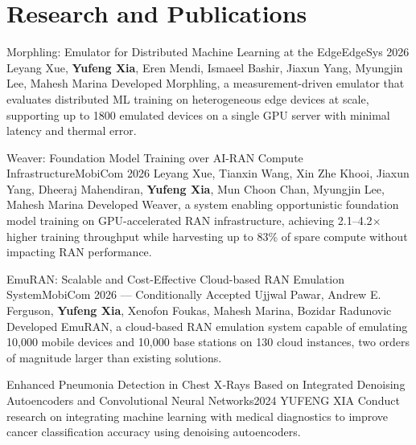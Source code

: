 \section{Research and Publications}
  \resumeSubHeadingListStart
    \resumeSubheading
      {Morphling: Emulator for Distributed Machine Learning at the Edge}{EdgeSys 2026}
      {Leyang Xue, \textbf{Yufeng Xia}, Eren Mendi, Ismaeel Bashir, Jiaxun Yang, Myungjin Lee, Mahesh Marina}{}
      \resumeItemListStart
          {Developed Morphling, a measurement-driven emulator that evaluates distributed ML training on heterogeneous edge devices at scale, supporting up to 1800 emulated devices on a single GPU server with minimal latency and thermal error.}
      \resumeItemListEnd

    \resumeSubheading
      {Weaver: Foundation Model Training over AI-RAN Compute Infrastructure}{MobiCom 2026}
      {Leyang Xue, Tianxin Wang, Xin Zhe Khooi, Jiaxun Yang, Dheeraj Mahendiran, \textbf{Yufeng Xia}, Mun Choon Chan, Myungjin Lee, Mahesh Marina}{}
      \resumeItemListStart
          {Developed Weaver, a system enabling opportunistic foundation model training on GPU-accelerated RAN infrastructure, achieving 2.1--4.2$\times$ higher training throughput while harvesting up to 83\% of spare compute without impacting RAN performance.}
      \resumeItemListEnd

    \resumeSubheading
      {EmuRAN: Scalable and Cost-Effective Cloud-based RAN Emulation System}{MobiCom 2026 --- Conditionally Accepted}
      {Ujjwal Pawar, Andrew E. Ferguson, \textbf{Yufeng Xia}, Xenofon Foukas, Mahesh Marina, Bozidar Radunovic}{}
      \resumeItemListStart
          {Developed EmuRAN, a cloud-based RAN emulation system capable of emulating 10,000 mobile devices and 10,000 base stations on 130 cloud instances, two orders of magnitude larger than existing solutions.}
      \resumeItemListEnd

    \resumeSubheading
      {Enhanced Pneumonia Detection in Chest X‑Rays Based on Integrated Denoising Autoencoders and Convolutional Neural Networks}{2024}
      {YUFENG XIA}{}
      \resumeItemListStart
          {Conduct research on integrating machine learning with medical diagnostics to improve cancer classification accuracy using denoising autoencoders.}
      \resumeItemListEnd

